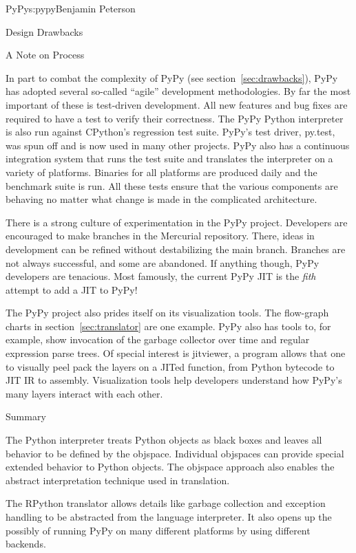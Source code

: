 \begin{aosachapter}{PyPy}{s:pypy}{Benjamin Peterson}
\begin{aosasect1}{Design Drawbacks}
\end{aosasect1}

\begin{aosasect1}{A Note on Process}

In part to combat the complexity of PyPy (see section~\ref{sec:drawbacks}), PyPy
has adopted several so-called ``agile'' development methodologies. By far the
most important of these is test-driven development. All new features and bug
fixes are required to have a test to verify their correctness. The PyPy Python
interpreter is also run against CPython's regression test suite. PyPy's test
driver, py.test, was spun off and is now used in many other projects. PyPy also
has a continuous integration system that runs the test suite and translates the
interpreter on a variety of platforms. Binaries for all platforms are produced
daily and the benchmark suite is run. All these tests ensure that the various
components are behaving no matter what change is made in the complicated
architecture.

There is a strong culture of experimentation in the PyPy project. Developers are
encouraged to make branches in the Mercurial repository. There, ideas in
development can be refined without destabilizing the main branch. Branches are
not always successful, and some are abandoned. If anything though, PyPy
developers are tenacious. Most famously, the current PyPy JIT is the \emph{fith}
attempt to add a JIT to PyPy!

The PyPy project also prides itself on its visualization tools. The flow-graph
charts in section~\ref{sec:translator} are one example. PyPy also has tools to,
for example, show invocation of the garbage collector over time and regular
expression parse trees. Of special interest is jitviewer, a program allows that
one to visually peel pack the layers on a JITed function, from Python bytecode
to JIT IR to assembly. Visualization tools help developers understand how PyPy's
many layers interact with each other.

\end{aosasect1}

\begin{aosasect1}{Summary}

The Python interpreter treats Python objects as black boxes and leaves all
behavior to be defined by the objspace. Individual objspaces can provide special
extended behavior to Python objects. The objspace approach also enables the
abstract interpretation technique used in translation.

The RPython translator allows details like garbage collection and exception
handling to be abstracted from the language interpreter. It also opens up the
possibly of running PyPy on many different platforms by using different
backends.


\end{aosasect1}
\end{aosachapter}
